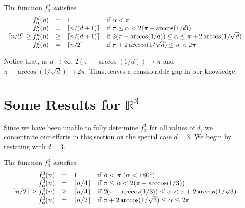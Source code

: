 \documentclass{dmtcs}
\newcommand{\R}{\mathbb{R}}
\begin{document}
\begin{thm}
The function $f_\alpha^d$ satisfies
\[\begin{array}{rcll}
  f^d_\alpha(n) & = & 1 & \mbox{if $\alpha < \pi$} \\
  f^d_\alpha(n) & = & \left\lceil n/(d+1) \right\rceil & \mbox{if $\pi\le \alpha <
2(\pi-\arccos(1/d))$} \\
\left\lceil n/2 \right\rceil\ge  f^d_\alpha(n) & \ge & \left\lceil n/(d+1) \right\rceil & \mbox{if
$2(\pi-\arccos(1/d)) \le \alpha \le \pi+2\arccos(1/\sqrt{d})$ } \\
  f^d_\alpha(n) & = & \left\lceil n/2 \right\rceil & \mbox{if
$\pi+2\arccos(1/\sqrt{d})\le \alpha < 2\pi$} \\
\end{array}\]
\end{thm}

Notice that, as $d\rightarrow\infty$, $2(\pi-\arccos(1/d))\rightarrow
\pi$ and $\pi+\arccos(1/\sqrt{d})\rightarrow 2\pi$.  Thus,
 leaves a considerable gap in our knowledge.


\section{Some Results for $\R^3$}

Since we have been unable to fully determine $f^d_\alpha$ for all
values of $d$, we concentrate our efforts in this section on the
special case $d=3$.  We begin by restating  with $d=3$.

\newcommand{\degrees}{^\circ}

\begin{cor}
The function $f_\alpha^3$ satisfies
\[\begin{array}{rcll}
  f^3_\alpha(n) & = & 1 & \mbox{if $\alpha < \pi$ 
                                ($\alpha < 180\degrees$)} \\
  f^3_\alpha(n) & = & \ceil{n/4} & 
    \mbox{if $\pi \le \alpha < 2(\pi-\arccos(1/3))$ 
         } \\
\ceil{n/2}\ge  f^3_\alpha(n) & \ge & \ceil{n/4} & 
    \mbox{if $2(\pi-\arccos(1/3)) \le \alpha < \pi+2\arccos(1/\sqrt{3})$ 
         } \\
  f^3_\alpha(n) & = & \ceil{n/2} & 
    \mbox{if $\pi+2\arccos(1/\sqrt{3}) \le \alpha \le 2\pi$ 
         } \\
\end{array}\]
\end{cor}
\end{document}
